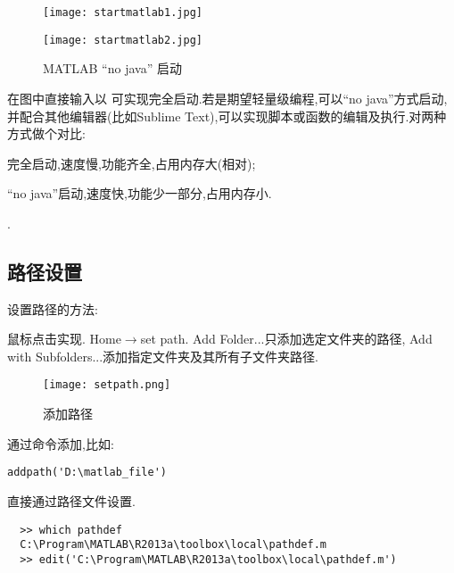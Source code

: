 \begin{figure}[htbp]
  \centering
  \texttt{[image: startmatlab1.jpg]}
\end{figure}

\begin{figure}[htbp]
  \centering
  \texttt{[image: startmatlab2.jpg]}
  \caption{MATLAB “no java” 启动}
\end{figure}

在图中直接输入以  可实现完全启动.若是期望轻量级编程,可以“no java”方式启动,并配合其他编辑器(比如Sublime Text),可以实现脚本或函数的编辑及执行.对两种方式做个对比:

\begindot
  \item 完全启动,速度慢,功能齐全,占用内存大(相对);
  \item “no java”启动,速度快,功能少一部分,占用内存小.
\myenddot

.


\subsection{路径设置}
设置路径的方法:
\begindot
\item 鼠标点击实现. Home$\rightarrow$set path. Add Folder...只添加选定文件夹的路径, Add with Subfolders...添加指定文件夹及其所有子文件夹路径.

  \begin{figure}[htbp]
    \centering
    \texttt{[image: setpath.png]}
    \caption{添加路径}
  \end{figure}

\item 通过命令添加,比如:

\vspace{-0.8cm}
\begin{lstlisting}[caption = 添加路径]
  addpath('D:\matlab_file')
\end{lstlisting}

\item 直接通过路径文件设置.

\vspace{-0.4cm}
\begin{lstlisting}
  >> which pathdef
  C:\Program\MATLAB\R2013a\toolbox\local\pathdef.m
  >> edit('C:\Program\MATLAB\R2013a\toolbox\local\pathdef.m')
\end{lstlisting}


